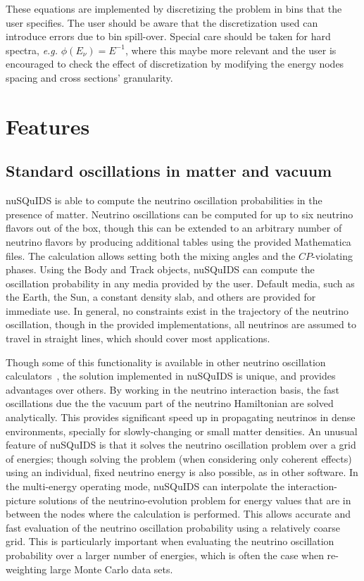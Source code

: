 \documentclass[3p,12pt]{elsarticle}
\newcommand{\ttf}{\ttfamily}
\begin{document}
These equations are implemented by discretizing the problem in bins that the user
specifies. The user should be aware that the discretization used can introduce errors due to
bin spill-over. Special care should be taken for hard spectra,
{\it e.g.} $\phi(E_\nu) = E^{-1}$, where this maybe more relevant and the user is encouraged
to check the effect of discretization by modifying the energy nodes spacing and cross sections' granularity.

\section{Features}
\label{sec:features}

\subsection{Standard oscillations in matter and vacuum}

{\ttf nuSQuIDS} is able to compute the neutrino oscillation probabilities in the presence of matter.
Neutrino oscillations can be computed for up to six neutrino flavors out of the box, though this can be extended to an arbitrary number of
neutrino flavors by producing additional tables using the provided {\ttf Mathematica} files.
The calculation allows setting both the mixing angles and the $CP$-violating phases.
Using the {\ttf Body} and {\ttf Track} objects, {\ttf nuSQuIDS} can compute the oscillation probability in any media provided by the user.
Default media, such as the Earth, the Sun, a constant density slab, and others are provided for immediate use.
In general, no constraints exist in the trajectory of the neutrino oscillation, though in the provided implementations, all neutrinos are assumed
to travel in straight lines, which should cover most applications.

Though some of this functionality is available in other neutrino oscillation
calculators~\citep{Huber:2007ji,prob3pp,Calland:2013vaa,Wallraff:2014vl}, the solution
implemented in {\ttf nuSQuIDS} is unique, and provides advantages over others.
By working in the neutrino interaction basis, the fast oscillations due the the vacuum part of the neutrino Hamiltonian are solved analytically.
This provides significant speed up in propagating neutrinos in dense environments, specially for slowly-changing or small matter densities.
An unusual feature of {\ttf nuSQuIDS} is that it solves the neutrino oscillation problem over a grid of energies;
though solving the problem (when considering only coherent effects) using an individual, fixed neutrino energy is also possible, as in other software.
In the multi-energy operating mode, {\ttf nuSQuIDS} can interpolate the interaction-picture solutions of the neutrino-evolution problem for energy values
that are in between the nodes where the calculation is performed.
This allows accurate and fast evaluation of the neutrino oscillation probability using a relatively coarse grid.
This is particularly important when evaluating the neutrino oscillation probability over a larger number of energies, which is often the case
when re-weighting large Monte Carlo data sets.
\end{document}
